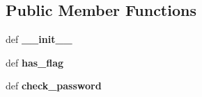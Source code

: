\subsection*{Public Member Functions}
\begin{DoxyCompactItemize}
\item 
\hypertarget{classcheshire3_1_1grid_1_1user_1_1_irods_user_ae1bfe7b7537059de45003d21179986ca}{def {\bfseries \-\_\-\-\_\-init\-\_\-\-\_\-}}\label{classcheshire3_1_1grid_1_1user_1_1_irods_user_ae1bfe7b7537059de45003d21179986ca}

\item 
\hypertarget{classcheshire3_1_1grid_1_1user_1_1_irods_user_ad859fd24b7f4c6ee960fcc29d4f5a838}{def {\bfseries has\-\_\-flag}}\label{classcheshire3_1_1grid_1_1user_1_1_irods_user_ad859fd24b7f4c6ee960fcc29d4f5a838}

\item 
\hypertarget{classcheshire3_1_1grid_1_1user_1_1_irods_user_ae3d837ef6f99984798ce2cddbda0cc76}{def {\bfseries check\-\_\-password}}\label{classcheshire3_1_1grid_1_1user_1_1_irods_user_ae3d837ef6f99984798ce2cddbda0cc76}

\end{DoxyCompactItemize}
